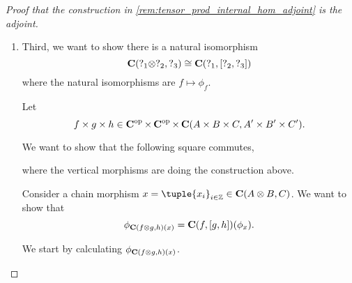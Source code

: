 \begin{proof}[Proof that the construction in \autoref{rem:tensor_prod_internal_hom_adjoint} is the adjoint]
\begin{enumerate}
{            By a similar argument, doing the reverse construction as above and going back again yields the same morphism, therefore \( f \mapsto \phi_f \) is a bijection.

            Finally, notice that every step of the construction is \( R \)-linear, therefore \( f \mapsto \phi_f \) is an isomorphism of modules.
        }
        \item {
            Third, we want to show there is a natural isomorphism
            \[
                \operatorname{\mathbf{C}}(?_1 \otimes ?_2, ?_3) \cong \operatorname{\mathbf{C}}(?_1, \left[ ?_2, ?_3 \right])
            \]
            where the natural isomorphisms are \( f \mapsto \phi_f \).

            Let
            \[
                f \times g \times h \in \operatorname{\mathbf{C}}^{\operatorname{op}} \times \operatorname{\mathbf{C}}^{\operatorname{op}} \times \operatorname{\mathbf{C}} (A \times B \times C, A' \times B' \times C').
            \]

            We want to show that the following square commutes,
            \begin{center}
            \end{center}
            where the vertical morphisms are doing the construction above.

            Consider a chain morphism \( x = \tuple{x_i}_{i \in \Zb} \in \C(A \otimes B, C) \). We want to show that
            \[
                \phi_{\operatorname{\mathbf{C}}(f \otimes g, h) (x)} = \operatorname{\mathbf{C}}(f, [g, h]) (\phi_x).
            \]

            We start by calculating \( \phi_{\operatorname{\mathbf{C}}(f \otimes g, h) (x)} \).

}
\end{enumerate}
\end{proof}
